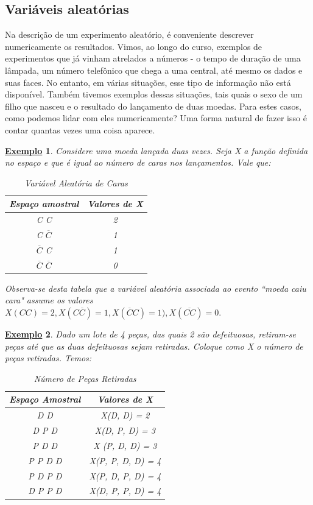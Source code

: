 \documentclass{article}
\newtheorem{example}{\underline{Exemplo}}
\begin{document}
\subsection{Variáveis aleatórias}
Na descrição de um experimento aleatório, é conveniente descrever numericamente os resultados.
Vimos, ao longo do curso, exemplos de experimentos que já vinham atrelados a números - o tempo de duração
de uma lâmpada, um número telefônico que chega a uma central, até mesmo os dados e suas faces. No entanto,
em várias situações, esse tipo de informação não está disponível. Também tivemos exemplos
dessas situações, tais quais o sexo de um filho que nasceu e o resultado do lançamento de duas moedas.
Para estes casos, como podemos lidar com eles numericamente? Uma forma natural de fazer
isso é contar quantas vezes uma coisa aparece.
\begin{example}
  Considere uma moeda lançada duas vezes. Seja X a função definida no espaço e que é
  igual ao número de caras nos lançamentos. Vale que:
  \begin{center}
    \begin{table}[h!]
      \caption{Variável Aleatória de Caras}
      \centering
      \begin{tabular}{| c | c |}
        \hline
        Espaço amostral & Valores de X\\
        \hline
        C C & 2\\
        C \(\overline{C}\) & 1\\
        \(\overline{C}\) C & 1\\
        \(\overline{C}\) \(\overline{C}\) & 0\\
        \hline
      \end{tabular}
    \end{table}
  \end{center}
  Observa-se desta tabela que a variável aleatória associada ao evento ``moeda caiu cara" assume os valores
  \(X(CC) = 2, X(C\overline{C})=1, X(\overline{C}C)=1), X(\overline{CC}) = 0.\)
\end{example}
\begin{example}
  Dado um lote de 4 peças, das quais 2 são defeituosas, retiram-se peças até que as duas defeituosas
  sejam retiradas. Coloque como X o número de peças retiradas. Temos:
  \begin{center}
    \begin{table}[h]
      \caption{Número de Peças Retiradas}
      \centering
      \begin{tabular}{| c | c |}
        \hline
        Espaço Amostral & Valores de X\\
        \hline
        D D & X(D, D) = 2\\
        D P D & X(D, P, D) = 3\\
        P D D & X (P, D, D) = 3\\
        P P D D & X(P, P, D, D) = 4\\
        P D P D & X(P, D, P, D) = 4\\
        D P P D & X(D, P, P, D) = 4\\
        \hline
      \end{tabular}
    \end{table}
  \end{center}
\end{example}
\end{document}
